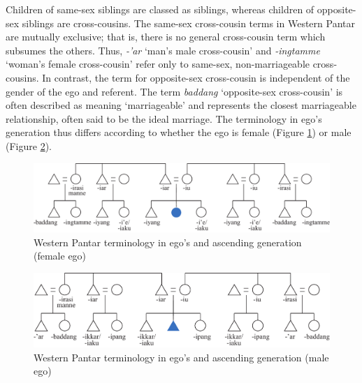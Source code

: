 Children of same-sex siblings are classed as siblings, whereas children of opposite-sex siblings are cross-cousins. The same-sex cross-cousin terms in Western Pantar are mutually exclusive; that is, there is no general cross-cousin term which subsumes the others. Thus, \textit{-'ar} `man's male cross-cousin' and \textit{-ingtamme} `woman's female cross-cousin' refer only to same-sex, non-marriageable cross-cousins. In contrast, the term for opposite-sex cross-cousin is independent of the gender of the ego and referent. The term \textit{baddang} `opposite-sex cross-cousin' is often described as meaning `marriageable' and represents the closest marriageable relationship, often said to be the ideal marriage. The terminology in ego's generation thus differs according to whether the ego is female (Figure \ref{fig:5:1}) or male (Figure \ref{fig:5:2}).

\begin{figure}[b]
\includegraphics[width=\textwidth]{figures/Holton_ch5_fig1.pdf}
\caption{Western Pantar terminology in ego's and ascending generation (female ego)}
\label{fig:5:1}
\end{figure}  
 
\begin{figure}[t]
\includegraphics[width=\textwidth]{figures/Holton_ch5_fig2.pdf}
\caption{Western Pantar terminology in ego's and ascending generation (male ego)}
\label{fig:5:2}
\end{figure} 
 

